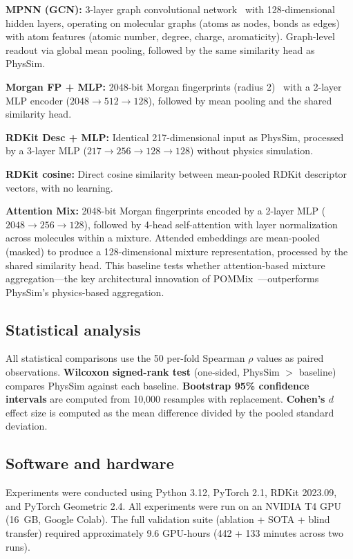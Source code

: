 \documentclass[11pt,a4paper]{article}
\begin{document}
\textbf{MPNN (GCN):} 3-layer graph convolutional network~\cite{gilmer2017} with 128-dimensional hidden layers, operating on molecular graphs (atoms as nodes, bonds as edges) with atom features (atomic number, degree, charge, aromaticity). Graph-level readout via global mean pooling, followed by the same similarity head as PhysSim.

\textbf{Morgan FP + MLP:} 2048-bit Morgan fingerprints (radius 2)~\cite{rogers2010} with a 2-layer MLP encoder ($2048 \to 512 \to 128$), followed by mean pooling and the shared similarity head.

\textbf{RDKit Desc + MLP:} Identical 217-dimensional input as PhysSim, processed by a 3-layer MLP ($217 \to 256 \to 128 \to 128$) without physics simulation.

\textbf{RDKit cosine:} Direct cosine similarity between mean-pooled RDKit descriptor vectors, with no learning.

\textbf{Attention Mix:} 2048-bit Morgan fingerprints encoded by a 2-layer MLP ($2048 \to 256 \to 128$), followed by 4-head self-attention with layer normalization across molecules within a mixture. Attended embeddings are mean-pooled (masked) to produce a 128-dimensional mixture representation, processed by the shared similarity head. This baseline tests whether attention-based mixture aggregation---the key architectural innovation of POMMix~\cite{nguyen2025pommix}---outperforms PhysSim's physics-based aggregation.

\subsection{Statistical analysis}

All statistical comparisons use the 50 per-fold Spearman $\rho$ values as paired observations. \textbf{Wilcoxon signed-rank test} (one-sided, PhysSim $>$ baseline) compares PhysSim against each baseline. \textbf{Bootstrap 95\% confidence intervals} are computed from 10,000 resamples with replacement. \textbf{Cohen's $d$} effect size is computed as the mean difference divided by the pooled standard deviation.

\subsection{Software and hardware}

Experiments were conducted using Python 3.12, PyTorch 2.1, RDKit 2023.09, and PyTorch Geometric 2.4. All experiments were run on an NVIDIA T4 GPU (16~GB, Google Colab). The full validation suite (ablation + SOTA + blind transfer) required approximately 9.6 GPU-hours (442 + 133 minutes across two runs).
\end{document}
